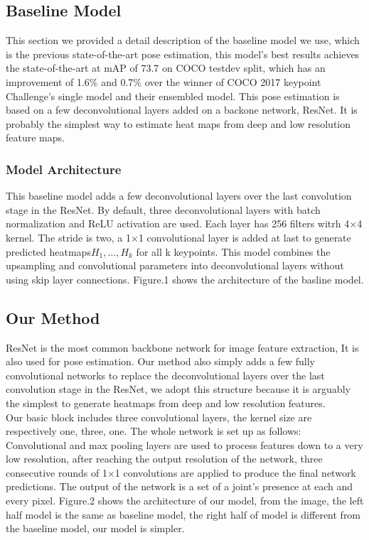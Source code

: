 \documentclass[final]{cvpr}
\begin{document}
\subsection{Baseline Model}
This section we provided a detail description of the baseline model we use, which is the previous state-of-the-art pose estimation, this model's best results achieves the state-of-the-art at mAP of 73.7 on COCO testdev split, which has an improvement of 1.6\% and 0.7\% over the winner of COCO 2017 keypoint Challenge's single model and their ensembled model. This pose estimation is based on a few deconvolutional layers added on a backone network, ResNet\cite{he2016deep}. It is probably the simplest way to estimate heat maps from deep and low resolution feature maps.\\
\subsubsection{Model Architecture}
This baseline model adds a few deconvolutional layers over the last convolution stage in the ResNet. By default, three deconvolutional layers with batch normalization and ReLU activation are used. Each layer has 256 filters witrh 4$\times$4 kernel. The stride is two, a 1$\times$1 convolutional layer is added at last to generate predicted heatmaps${H_1,\ldots,H_k}$ for all k keypoints. This model combines the upsampling and convolutional parameters into deconvolutional layers without using skip layer connections. Figure.1 shows the architecture of the basline model.
\subsection{Our Method}
ResNet is the most common backbone network for image feature extraction, It is also used for pose estimation. Our method also simply adds a few fully convolutional networks to replace the deconvolutional layers over the last convolution stage in the ResNet, we adopt this structure because it is arguably the simplest to generate heatmaps from deep and low resolution features. \\
\indent Our basic block includes three  convolutional layers, the kernel size are respectively one, three, one. The whole network is set up as follows: Convolutional and max pooling layers are used to process features down to a very low resolution, after reaching the output resolution of the network, three consecutive rounds of 1$\times$1 convolutions are applied to produce the final network predictions. The output of the network is a set of a joint's presence at each and every pixel. Figure.2 shows the architecture of our model, from the image, the left half model is the same as baseline model, the right half of model is different from the baseline model, our model is simpler.
\end{document}
